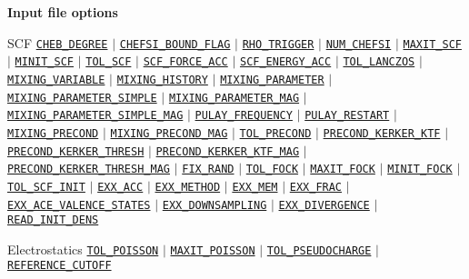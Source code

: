 \begin{frame}[allowframebreaks]{\textbf{Input file options}}
  \begin{block}{SCF}
  \hyperlink{CHEB_DEGREE}{\texttt{CHEB\_DEGREE}} $\vert$
  \hyperlink{CHEFSI_BOUND_FLAG}{\texttt{CHEFSI\_BOUND\_FLAG}} $\vert$
  \hyperlink{RHO_TRIGGER}{\texttt{RHO\_TRIGGER}} $\vert$
  \hyperlink{NUM_CHEFSI}{\texttt{NUM\_CHEFSI}} $\vert$
  \hyperlink{MAXIT_SCF}{\texttt{MAXIT\_SCF}} $\vert$
  \hyperlink{MINIT_SCF}{\texttt{MINIT\_SCF}} $\vert$
  \hyperlink{TOL_SCF}{\texttt{TOL\_SCF}} $\vert$
  \hyperlink{SCF_FORCE_ACC}{\texttt{SCF\_FORCE\_ACC}} $\vert$
  \hyperlink{SCF_ENERGY_ACC}{\texttt{SCF\_ENERGY\_ACC}} $\vert$
  \hyperlink{TOL_LANCZOS}{\texttt{TOL\_LANCZOS}} $\vert$
  \hyperlink{MIXING_VARIABLE}{\texttt{MIXING\_VARIABLE}} $\vert$
  \hyperlink{MIXING_HISTORY}{\texttt{MIXING\_HISTORY}} $\vert$
  \hyperlink{MIXING_PARAMETER}{\texttt{MIXING\_PARAMETER}} $\vert$
  \hyperlink{MIXING_PARAMETER_SIMPLE}{\texttt{MIXING\_PARAMETER\_SIMPLE}} $\vert$
  \hyperlink{MIXING_PARAMETER_MAG}{\texttt{MIXING\_PARAMETER\_MAG}} $\vert$
  \hyperlink{MIXING_PARAMETER_SIMPLE_MAG}{\texttt{MIXING\_PARAMETER\_SIMPLE\_MAG}} $\vert$
  \hyperlink{PULAY_FREQUENCY}{\texttt{PULAY\_FREQUENCY}} $\vert$
  \hyperlink{PULAY_RESTART}{\texttt{PULAY\_RESTART}} $\vert$
  \hyperlink{MIXING_PRECOND}{\texttt{MIXING\_PRECOND}} $\vert$
  \hyperlink{MIXING_PRECOND_MAG}{\texttt{MIXING\_PRECOND\_MAG}} $\vert$
  \hyperlink{TOL_PRECOND}{\texttt{TOL\_PRECOND}} $\vert$
  \hyperlink{PRECOND_KERKER_KTF}{\texttt{PRECOND\_KERKER\_KTF}} $\vert$
  \hyperlink{PRECOND_KERKER_THRESH}{\texttt{PRECOND\_KERKER\_THRESH}} $\vert$
  \hyperlink{PRECOND_KERKER_KTF_MAG}{\texttt{PRECOND\_KERKER\_KTF\_MAG}} $\vert$
  \hyperlink{PRECOND_KERKER_THRESH_MAG}{\texttt{PRECOND\_KERKER\_THRESH\_MAG}} $\vert$
  \hyperlink{FIX_RAND}{\texttt{FIX\_RAND}} $\vert$ 
  \hyperlink{TOL_FOCK}{\texttt{TOL\_FOCK}} $\vert$ 
  \hyperlink{MAXIT_FOCK}{\texttt{MAXIT\_FOCK}} $\vert$ 
  \hyperlink{MINIT_FOCK}{\texttt{MINIT\_FOCK}} $\vert$ 
  \hyperlink{TOL_SCF_INIT}{\texttt{TOL\_SCF\_INIT}} $\vert$ 
  \hyperlink{EXX_ACC}{\texttt{EXX\_ACC}} $\vert$ 
  \hyperlink{EXX_METHOD}{\texttt{EXX\_METHOD}} $\vert$ 
  \hyperlink{EXX_MEM}{\texttt{EXX\_MEM}} $\vert$ 
  \hyperlink{EXX_FRAC}{\texttt{EXX\_FRAC}} $\vert$ 
  \hyperlink{EXX_ACE_VALENCE_STATES}{\texttt{EXX\_ACE\_VALENCE\_STATES}} $\vert$ 
  \hyperlink{EXX_DOWNSAMPLING}{\texttt{EXX\_DOWNSAMPLING}} $\vert$ 
  \hyperlink{EXX_DIVERGENCE}{\texttt{EXX\_DIVERGENCE}} $\vert$ 
  \hyperlink{READ_INIT_DENS}{\texttt{READ\_INIT\_DENS}} 
  \end{block}
  
  \vspace{-2mm}
  \begin{block}{Electrostatics}
  \hyperlink{TOL_POISSON}{\texttt{TOL\_POISSON}} $\vert$
  \hyperlink{MAXIT_POISSON}{\texttt{MAXIT\_POISSON}} $\vert$
  \hyperlink{TOL_PSEUDOCHARGE}{\texttt{TOL\_PSEUDOCHARGE}} $\vert$
  \hyperlink{REFERENCE_CUTOFF}{\texttt{REFERENCE\_CUTOFF}} 
  \end{block}
  

\end{frame}
